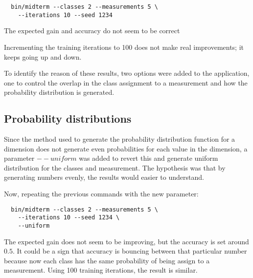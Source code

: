 \documentclass[letterpaper, conference]{IEEEtran}
\begin{document}
\begin{verbatim}
  bin/midterm --classes 2 --measurements 5 \
    --iterations 10 --seed 1234
\end{verbatim}

The expected gain and accuracy do not seem to be correct

\begin{figure}[hbt]
  \label{fig:10-training-2-classes}
  \caption{}
\end{figure}

Incrementing the training iterations to 100 does not make real improvements; it keeps going up and down.

\begin{figure}[hbt]
  \label{fig:100-training-2-classes}
  \caption{}
\end{figure}

To identify the reason of these results, two options were added to the application, one to control the overlap in the class assignment to a measurement and how the probability distribution is generated.

\subsection{Probability distributions}

Since the method used to generate the probability distribution function for a dimension does not generate even probabilities for each value in the dimension, a parameter $--uniform$ was added to revert this and generate uniform distribution for the classes and measurement. The hypothesis was that by generating numbers evenly, the results would easier to understand.

Now, repeating the previous commands with the new parameter:

\begin{verbatim}
  bin/midterm --classes 2 --measurements 5 \
    --iterations 10 --seed 1234 \
    --uniform
\end{verbatim}

\begin{figure}[hbt]
  \label{fig:10-training-2-classes-uniform}
  \caption{}
\end{figure}

The expected gain does not seem to be improving, but the accuracy is set around $0.5$. It could be a sign that accuracy is bouncing between that particular number because now each class has the same probability of being assign to a measurement. Using 100 training iterations, the result is similar.
\end{document}
